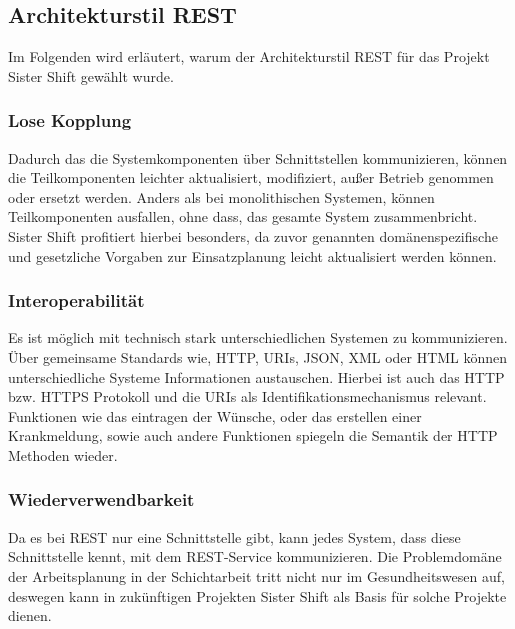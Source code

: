 \documentclass[10pt,a4paper]{article}
\begin{document}
\subsection{Architekturstil REST}
Im Folgenden wird erläutert, warum der Architekturstil REST für das Projekt Sister Shift gewählt wurde.
\subsubsection{Lose Kopplung}
Dadurch das die Systemkomponenten über Schnittstellen kommunizieren, können die Teilkomponenten leichter aktualisiert, modifiziert, außer Betrieb genommen oder ersetzt werden. Anders als bei monolithischen Systemen, können Teilkomponenten ausfallen, ohne dass, das gesamte System zusammenbricht. Sister Shift profitiert hierbei besonders, da zuvor genannten domänenspezifische und gesetzliche Vorgaben zur Einsatzplanung leicht aktualisiert werden können.
\subsubsection{Interoperabilität}
Es ist möglich mit technisch stark unterschiedlichen Systemen zu kommunizieren. Über gemeinsame Standards wie, HTTP, URIs,
JSON, XML oder HTML können unterschiedliche Systeme Informationen austauschen. Hierbei ist auch das HTTP bzw. HTTPS Protokoll und die URIs als Identifikationsmechanismus relevant. Funktionen wie das eintragen der Wünsche, oder das erstellen einer Krankmeldung, sowie auch andere Funktionen spiegeln die Semantik der HTTP Methoden wieder.
\subsubsection{Wiederverwendbarkeit}
Da es bei REST nur eine Schnittstelle gibt, kann jedes System, dass diese Schnittstelle kennt, mit dem REST-Service kommunizieren. Die Problemdomäne der Arbeitsplanung in der Schichtarbeit tritt nicht nur im Gesundheitswesen auf, deswegen kann in zukünftigen Projekten Sister Shift als Basis für solche Projekte dienen. 
\end{document}
